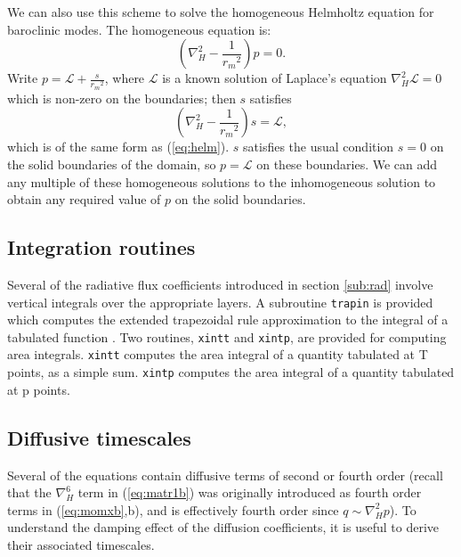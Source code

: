 \documentclass[11pt, a4paper,twoside]{article}
\newcommand{\rdm}[0]{{r_m}}
\numberwithin{equation}{section}
\begin{document}
We can also use this scheme to solve the homogeneous Helmholtz equation for baroclinic modes.
The homogeneous equation is:
\begin{equation}\label{eq:helm1}
\left(\nabla_H^2- \frac{1}{\rdm^2} \right) p = 0.
\end{equation}
Write $p = \mathcal{L} + \frac{s}{\rdm^2}$, where $\mathcal{L}$ is a known solution of Laplace's equation $\nabla_H^2 \mathcal{L} = 0$ which is non-zero on the boundaries; then $s$ satisfies
\begin{equation}\label{eq:helm2}
\left(\nabla_H^2- \frac{1}{\rdm^2} \right) s = \mathcal{L},
\end{equation}
which is of the same form as (\ref{eq:helm}).
$s$ satisfies the usual condition $s = 0$ on the solid boundaries of the domain, so $p = \mathcal{L}$ on these boundaries.
We can add any multiple of these homogeneous solutions to the inhomogeneous solution to obtain any required value of $p$ on the solid boundaries.

\subsection{Integration routines}
Several of the radiative flux coefficients introduced in section \ref{sub:rad} involve vertical integrals over the appropriate layers.
A subroutine \verb=trapin= is provided which computes the extended trapezoidal rule approximation to the integral of a tabulated function \citep{press:92}.
Two routines, \verb=xintt= and \verb=xintp=, are provided for computing area integrals.
\verb=xintt= computes the area integral of a quantity tabulated at T points, as a simple sum.
\verb=xintp= computes the area integral of a quantity tabulated at p points.

\subsection{Diffusive timescales}
Several of the equations contain diffusive terms of second or fourth order (recall that the $\nabla_H^6$ term in (\ref{eq:matr1b}) was originally introduced as fourth order terms in (\ref{eq:momxb},b), and is effectively fourth order since $q \sim \nabla_H^2p$).
To understand the damping effect of the diffusion coefficients, it is useful to derive their associated timescales.
\end{document}
